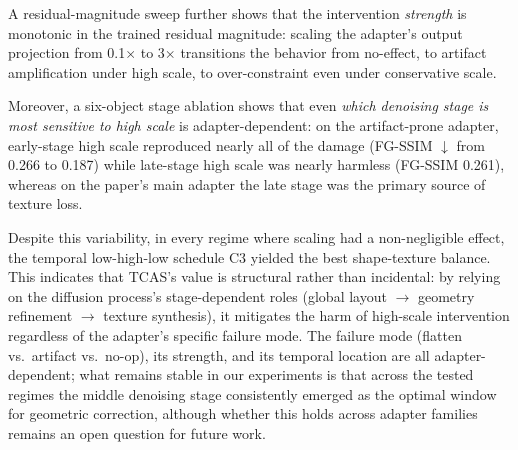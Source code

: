 \documentclass[times,twocolumn,final]{elsarticle}
\begin{document}
A residual-magnitude sweep further shows that the intervention \emph{strength} is monotonic in the trained residual magnitude: scaling the adapter's output projection from 0.1$\times$ to 3$\times$ transitions the behavior from no-effect, to artifact amplification under high scale, to over-constraint even under conservative scale.

Moreover, a six-object stage ablation shows that even \emph{which denoising stage is most sensitive to high scale} is adapter-dependent: on the artifact-prone adapter, early-stage high scale reproduced nearly all of the damage (FG-SSIM $\downarrow$ from 0.266 to 0.187) while late-stage high scale was nearly harmless (FG-SSIM 0.261), whereas on the paper's main adapter the late stage was the primary source of texture loss.

Despite this variability, in every regime where scaling had a non-negligible effect, the temporal low-high-low schedule C3 yielded the best shape-texture balance. This indicates that TCAS's value is structural rather than incidental: by relying on the diffusion process's stage-dependent roles (global layout $\to$ geometry refinement $\to$ texture synthesis), it mitigates the harm of high-scale intervention regardless of the adapter's specific failure mode. The failure mode (flatten vs.\ artifact vs.\ no-op), its strength, and its temporal location are all adapter-dependent; what remains stable in our experiments is that across the tested regimes the middle denoising stage consistently emerged as the optimal window for geometric correction, although whether this holds across adapter families remains an open question for future work.
\end{document}
